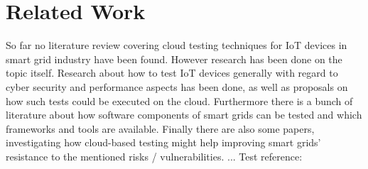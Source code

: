 \section{Related Work}
So far no literature review covering cloud testing techniques for IoT devices in smart grid industry have been found. However research has been done on the topic itself. Research about how to test IoT devices generally with regard to cyber security and performance aspects has been done, as well as proposals on how such tests could be executed on the cloud. Furthermore there is a bunch of literature about how software components of smart grids can be tested and which frameworks and tools are available. Finally there are also some papers, investigating how cloud-based testing might help improving smart grids' resistance to the mentioned risks / vulnerabilities.
...
Test reference: \cite{bertolino2019systematic}
